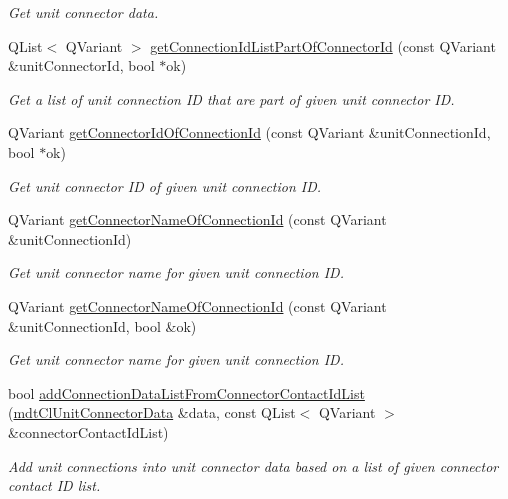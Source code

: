 \begin{DoxyCompactItemize}
\begin{DoxyCompactList}\small\item\em Get unit connector data. \end{DoxyCompactList}\item 
Q\-List$<$ Q\-Variant $>$ \hyperlink{classmdt_cl_unit_acaefd010c898e3091784434a7f731aaa}{get\-Connection\-Id\-List\-Part\-Of\-Connector\-Id} (const Q\-Variant \&unit\-Connector\-Id, bool $\ast$ok)
\begin{DoxyCompactList}\small\item\em Get a list of unit connection I\-D that are part of given unit connector I\-D. \end{DoxyCompactList}\item 
Q\-Variant \hyperlink{classmdt_cl_unit_ab7aca8211857c7842102593aaf07eaa1}{get\-Connector\-Id\-Of\-Connection\-Id} (const Q\-Variant \&unit\-Connection\-Id, bool $\ast$ok)
\begin{DoxyCompactList}\small\item\em Get unit connector I\-D of given unit connection I\-D. \end{DoxyCompactList}\item 
Q\-Variant \hyperlink{classmdt_cl_unit_aa6bb1b3c37bde88ed4586f014c1c4953}{get\-Connector\-Name\-Of\-Connection\-Id} (const Q\-Variant \&unit\-Connection\-Id)
\begin{DoxyCompactList}\small\item\em Get unit connector name for given unit connection I\-D. \end{DoxyCompactList}\item 
Q\-Variant \hyperlink{classmdt_cl_unit_af47acff8397cfb5b582df3a0ec074b13}{get\-Connector\-Name\-Of\-Connection\-Id} (const Q\-Variant \&unit\-Connection\-Id, bool \&ok)
\begin{DoxyCompactList}\small\item\em Get unit connector name for given unit connection I\-D. \end{DoxyCompactList}\item 
bool \hyperlink{classmdt_cl_unit_ac05aad687744aaedeef602075e28fdf7}{add\-Connection\-Data\-List\-From\-Connector\-Contact\-Id\-List} (\hyperlink{classmdt_cl_unit_connector_data}{mdt\-Cl\-Unit\-Connector\-Data} \&data, const Q\-List$<$ Q\-Variant $>$ \&connector\-Contact\-Id\-List)
\begin{DoxyCompactList}\small\item\em Add unit connections into unit connector data based on a list of given connector contact I\-D list. \end{DoxyCompactList}\item 

\end{DoxyCompactItemize}

